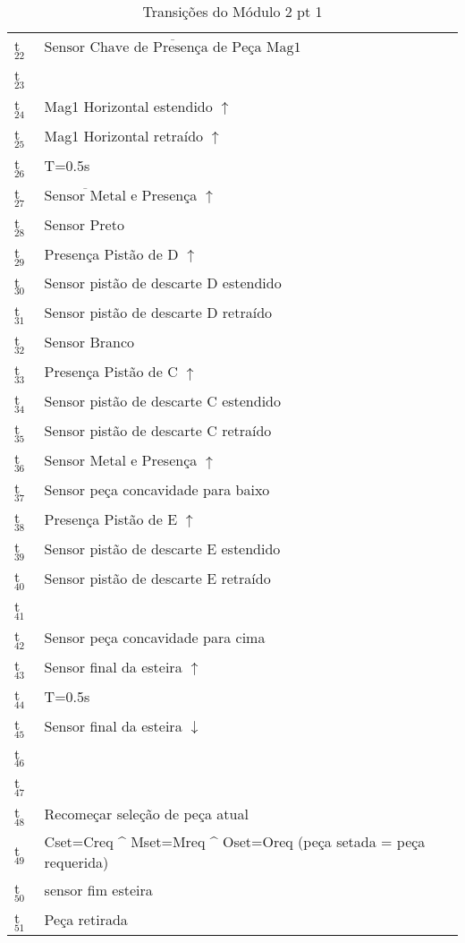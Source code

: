 \documentclass[11pt]{article}
\begin{document}
\begin{table}[htb]
\caption{Transições do Módulo 2 pt 1}
\centering
\begin{tabular}{ll}
t$_{\text{22}}$ & $\overline{\mbox{Sensor Chave de Presença de Peça Mag1}}$\\
t$_{\text{23}}$ & \\
t$_{\text{24}}$ & Mag1 Horizontal estendido $\uparrow$\\
t$_{\text{25}}$ & Mag1 Horizontal retraído $\uparrow$\\
t$_{\text{26}}$ & T=0.5s\\
t$_{\text{27}}$ & $\overline{\mbox{Sensor Metal}}$ e Presença $\uparrow$\\
t$_{\text{28}}$ & Sensor Preto\\
t$_{\text{29}}$ & Presença Pistão de D $\uparrow$\\
t$_{\text{30}}$ & Sensor pistão de descarte D estendido\\
t$_{\text{31}}$ & Sensor pistão de descarte D retraído\\
t$_{\text{32}}$ & Sensor Branco\\
t$_{\text{33}}$ & Presença Pistão de C $\uparrow$\\
t$_{\text{34}}$ & Sensor pistão de descarte C estendido\\
t$_{\text{35}}$ & Sensor pistão de descarte C retraído\\
t$_{\text{36}}$ & Sensor Metal e Presença $\uparrow$\\
t$_{\text{37}}$ & Sensor peça concavidade para baixo\\
t$_{\text{38}}$ & Presença Pistão de E $\uparrow$\\
t$_{\text{39}}$ & Sensor pistão de descarte E estendido\\
t$_{\text{40}}$ & Sensor pistão de descarte E retraído\\
t$_{\text{41}}$\\
t$_{\text{42}}$ & Sensor peça concavidade para cima\\
t$_{\text{43}}$ & Sensor final da esteira $\uparrow$\\
t$_{\text{44}}$ & T=0.5s\\
t$_{\text{45}}$ & Sensor final da esteira $\downarrow$\\
t$_{\text{46}}$\\
t$_{\text{47}}$\\
t$_{\text{48}}$ & Recomeçar seleção de peça atual\\
t$_{\text{49}}$ & Cset=Creq \^{} Mset=Mreq \^{} Oset=Oreq (peça setada = peça requerida)\\
t$_{\text{50}}$ & sensor fim esteira\\
t$_{\text{51}}$ & Peça retirada\\
\end{tabular}
\end{table}
\end{document}
